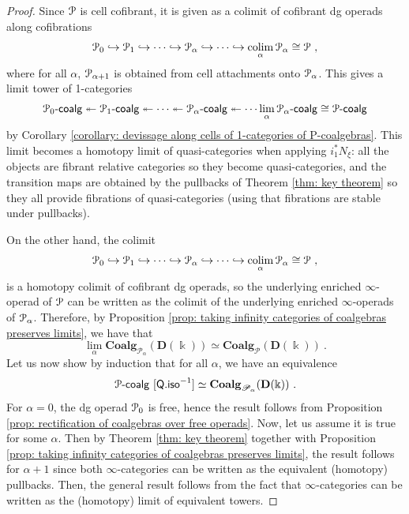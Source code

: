 \documentclass{proc-l}
\renewcommand{\mathcal}{\EuScript}
\DeclareMathOperator*{\colim}{colim}
\newcommand{\oneop}{\mathcal{P}}
\newcommand{\onecoalg}[1]{#1\text{-}\mathsf{coalg}}
\theoremstyle{plain}
\theoremstyle{definition}
\theoremstyle{remark}
\newcommand{\kk}{\Bbbk}
\begin{document}
\begin{proof}
Since $\mathcal{P}$ is cell cofibrant, it is given as a colimit of cofibrant dg operads along cofibrations
\[
\oneop_0 \hookrightarrow \oneop_1 \hookrightarrow \cdots \hookrightarrow \oneop_\alpha \hookrightarrow \cdots \hookrightarrow \colim_{\alpha} \oneop_\alpha \cong \oneop~,
\]
where for all $\alpha$, $\oneop_{\alpha +1}$ is obtained from cell attachments onto $\oneop_\alpha$. This gives a limit tower of 1-categories
\[
\onecoalg{\oneop_0}  \twoheadleftarrow \onecoalg{\oneop_1} \twoheadleftarrow \cdots \twoheadleftarrow \onecoalg{\oneop_\alpha}  \twoheadleftarrow  \cdots \lim_{\alpha}\onecoalg{\oneop_\alpha} \cong \onecoalg{\oneop}
\]
by Corollary \ref{corollary: devissage along cells of 1-categories of P-coalgebras}. This limit becomes a homotopy limit of quasi-categories when applying $i_1^*N_{\xi}$: all the objects are fibrant relative categories so they become quasi-categories, and the transition maps are obtained by the pullbacks of Theorem \ref{thm: key theorem} so they all provide fibrations of quasi-categories (using that fibrations are stable under pullbacks).

On the other hand, the colimit
\[
\oneop_0 \hookrightarrow \oneop_1 \hookrightarrow \cdots \hookrightarrow \oneop_\alpha \hookrightarrow \cdots \hookrightarrow \colim_{\alpha} \oneop_\alpha \cong \oneop~,
\]
is a homotopy colimit of cofibrant dg operads, so the underlying enriched $\infty$-operad of $\mathcal{P}$ can be written as the colimit of the underlying enriched $\infty$-operads of $\oneop_\alpha$. Therefore, by Proposition \ref{prop: taking infinity categories of coalgebras preserves limits}, we have that
\[
\lim_{\alpha} \mathbf{Coalg}_{\mathscr{P}_\alpha}(\mathbf{D}(\kk)) \simeq \mathbf{Coalg}_{\mathscr{P}}(\mathbf{D}(\kk))~.
\]
Let us now show by induction that for all $\alpha$, we have an equivalence
\[
\mathcal{P}\text{-}\mathsf{coalg}~[\mathsf{Q.iso}^{-1}] \simeq \mathbf{Coalg}_{\mathscr{P}_\alpha}(\mathbf{D}(\kk))~.
\]
For $\alpha = 0$, the dg operad $\mathcal{P}_0$ is free, hence the result follows from Proposition \ref{prop: rectification of coalgebras over free operads}. Now, let us assume it is true for some $\alpha$. Then by Theorem \ref{thm: key theorem} together with Proposition \ref{prop: taking infinity categories of coalgebras preserves limits}, the result follows for $\alpha +1$ since both $\infty$-categories can be written as the equivalent (homotopy) pullbacks. Then, the general result follows from the fact that $\infty$-categories can be written as the (homotopy) limit of equivalent towers.
\end{proof}
\end{document}
